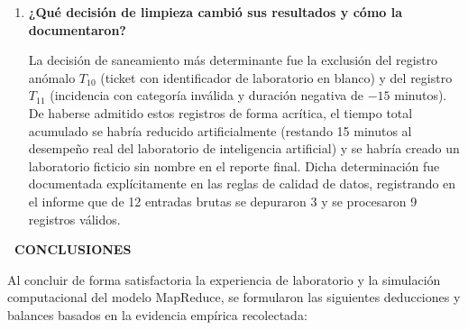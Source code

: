 \documentclass[12pt,a4paper]{article}
\newcommand{\llav}{\symbol{60}\symbol{60}}
\newcommand{\rlav}{\symbol{62}\symbol{62}}
\newcommand{\marcador}[1]{\llav\ #1\ \rlav}
\newcommand{\seccion}[1]{%
  \vspace{0.6cm}%
  {\centering\bfseries\fontsize{12pt}{14pt}\selectfont\marcador{\MakeUppercase{#1}}\par}%
  \vspace{0.35cm}%
}
\begin{document}
\begin{enumerate}
    \item \textbf{¿Qué decisión de limpieza cambió sus resultados y cómo la documentaron?}
    
    La decisión de saneamiento más determinante fue la exclusión del registro anómalo $T_{10}$ (ticket con identificador de laboratorio en blanco) y del registro $T_{11}$ (incidencia con categoría inválida y duración negativa de $-15$ minutos). De haberse admitido estos registros de forma acrítica, el tiempo total acumulado se habría reducido artificialmente (restando 15 minutos al desempeño real del laboratorio de inteligencia artificial) y se habría creado un laboratorio ficticio sin nombre en el reporte final. Dicha determinación fue documentada explícitamente en las reglas de calidad de datos, registrando en el informe que de 12 entradas brutas se depuraron 3 y se procesaron 9 registros válidos.
\end{enumerate}

\clearpage

\seccion{CONCLUSIONES}

Al concluir de forma satisfactoria la experiencia de laboratorio y la simulación computacional del modelo MapReduce, se formularon las siguientes deducciones y balances basados en la evidencia empírica recolectada:
\end{document}
